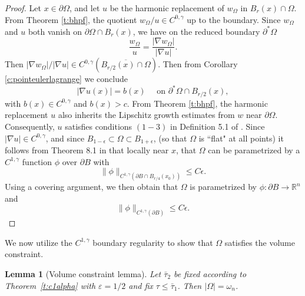 \documentclass[10pt, reqno]{amsart}
\numberwithin{equation}{section}
\newtheorem{lemma}[theorem]{Lemma}
\def\e{\varepsilon}
\def\W{\Omega}
\begin{document}
\begin{proof}
    Let $x \in \partial \W$, and let $u$ be the harmonic replacement of $w_{\W}$ in $B_r(x)\cap \W$. From Theorem \ref{t:bhpf}, the quotient $w_{\W}/u \in C^{0,\gamma}$ up to the boundary. Since $w_{\W}$ and $u$ both vanish on $\partial \W \cap B_{r}(x)$, we have on the reduced boundary $\partial^* \W$
    \[
    \frac{w_{\W}}{u} = \frac{|\nabla w_{\W}|}{|\nabla u|}.
    \]
    Then $|\nabla w_{\W}|/|\nabla u| \in C^{0,\gamma}(\overline{B_{r/2}(x) \cap \W})$. Then  from Corollary \ref{c:pointeulerlagrange} we conclude
    \[
    |\nabla u(x)|=b(x) \quad \text{ on } \partial^* \W \cap B_{r/2}(x),
    \]
    with $b(x) \in C^{0,\gamma}$ and $b(x)>c$. 
     From Theorem \ref{t:bhpf}, the harmonic replacement $u$ also inherits the Lipschitz growth estimates from $w$ near $\partial \W$. Consequently, $u$ satisfies conditions $(1-3)$ in Definition 5.1 of \cite{AC81}. Since $|\nabla u| \in C^{0,\gamma}$, and since $B_{1-\epsilon} \subset \Omega \subset B_{1+\epsilon}$, (so that $\W$ is ``flat" at all points) it follows from Theorem 8.1 in \cite{AC81} that locally near $x$, that $\W$ can be parametrized by a $C^{1,\gamma}$ function $\phi$ over $\partial B$ with 
\[
 \| \phi \|_{C^{1,\gamma}(\partial B \cap B_{r/4}(x_0))} \leq C \epsilon.
\]
Using a covering argument, we then obtain that $\W$ is parametrized by $\phi: \partial B \to \mathbb{R}^n$ and 
\[
\| \phi \|_{C^{1,\gamma}(\partial B)} \leq C \epsilon.
\]
\end{proof}


We now utilize the $C^{1,\gamma}$ boundary regularity to show that $\W$ satisfies the volume constraint. 

\begin{lemma}[Volume constraint lemma]\label{lem: volume constraint lemma}\label{p:volume} Let $\bar{\tau}_2$ be fixed according to Theorem~\ref{t:c1alpha} with $\e = 1/2$ and fix $\tau \leq \bar{\tau}_1$. Then $|\W| = \omega_n$.
\end{lemma}
\end{document}
